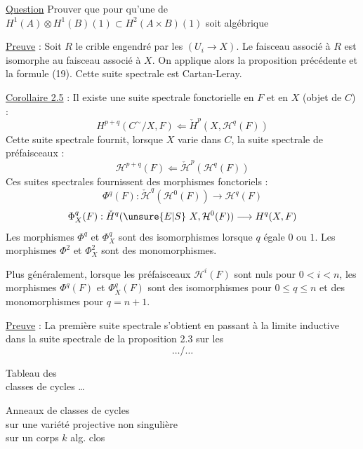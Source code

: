 \uline{Question} Prouver que pour qu'une  de $H^1(A)\otimes H^1(B)(1)\subset H^2(A\times B)(1)$ soit algébrique


\uline{Preuve} : Soit $R$ le crible engendré par les $(U_i\longrightarrow X)$. Le faisceau associé à $R$ est isomorphe au faisceau associé à $X$. On applique alors la proposition précédente et la formule (19).
Cette suite spectrale est  Cartan-Leray.

\uline{Corollaire 2.5} : Il existe une suite spectrale fonctorielle en $F$ et en $X$ (objet de $C$) :
\[
H^{p+q}(C^{\sim}/X,F)\Longleftarrow\check H^p(X,\mathcal H^q(F))
\]
Cette suite spectrale fournit, lorsque $X$ varie dans $C$, la suite spectrale de préfaisceaux :
\[
\mathcal H^{p+q}(F)\Longleftarrow\check{\mathcal H}^{p}(\mathcal H^q(F))
\]
Ces suites spectrales fournissent des morphismes fonctoriels :
\margin{$\unsure{\checkmark}$}
\[
\Phi^q(F):\check{\mathcal H}^{q}(\mathcal H^0(F))\longrightarrow\mathcal H^q(F)
\]
\[
\Phi_X^q(F):\check H^q(\unsure{E|S}\ X,\mathcal H^0(F))\longrightarrow H^q(X,F)
\]
Les morphismes $\Phi^q$ et $\Phi_X^q$ sont des isomorphismes lorsque $q$ égale $0$ ou $1$. Les morphismes $\Phi^2$ et $\Phi_X^2$ sont des monomorphismes.

Plus généralement, lorsque les préfaisceaux $\mathcal H^i(F)$ sont nuls pour $0<i<n$, les morphismes $\Phi^q(F)$ et $\Phi_X^q(F)$ sont des isomorphismes pour $0\leq q\leq n$ et des monomorphismes pour $q=n+1$.

\uline{Preuve} : La première suite spectrale s'obtient en passant à la limite inductive dans la suite spectrale de la proposition 2.3 sur les
\[\ldots/\ldots\]
\begin{flushright}
Tableau des\\
classes de cycles \ldots
\end{flushright}

Anneaux de classes de cycles\\
sur une variété projective non singulière\\
sur un corps $k$ alg. clos

